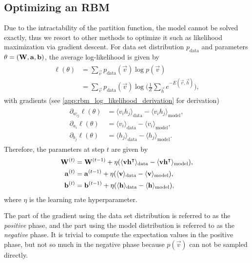\subsection{Optimizing an RBM}
Due to the intractability of the partition function, the model cannot be solved exactly, thus we resort to other methods to optimize it such as likelihood maximization via gradient descent.
For data set distribution \( p_\text{data} \) and parameters \( \theta = (\mathbf{W}, \mathbf{a}, \mathbf{b}) \), the average log-likelihood is given by
\begin{align}
\begin{split}
    \ell(\theta)
        &= \sum_{\vec{v}} p_{\text{data}}(\vec{v}) \log p(\vec{v}) \\
        &= \sum_{\vec{v}} p_{\text{data}}(\vec{v}) \log \bigg(\frac{1}{Z} \sum_\vec{h} e^{-E(\vec{v},\vec{h})}\bigg),
\end{split}
\end{align}
with gradients (see \cref{app:rbm_log_likelihood_derivation} for derivation)
\begin{align}
\begin{split}
    \partial_{w_{ij}} \ell(\theta)
        &= \langle v_i h_j \rangle_{\text{data}} - \langle v_i h_j \rangle_{\text{model}}, \\
    \partial_{a_i} \ell(\theta)
        &= \langle v_i \rangle_{\text{data}} - \langle v_i \rangle_{\text{model}}, \\
    \partial_{b_j} \ell(\theta)
        &= \langle h_j \rangle_{\text{data}} - \langle h_j \rangle_{\text{model}}.
\end{split}
\end{align}
Therefore, the parameters at step \( t \) are given by
\begin{align}
\begin{split}
    \mathbf{W}^{(t)}
        &= \mathbf{W}^{(t-1)} + \eta(\langle \mathbf{v} \mathbf{h}^\intercal \rangle_{\text{data}} - \langle \mathbf{v} \mathbf{h}^\intercal \rangle_{\text{model}}), \\
    \mathbf{a}^{(t)}
        &= \mathbf{a}^{(t-1)} + \eta(\langle \mathbf{v} \rangle_{\text{data}} - \langle \mathbf{v} \rangle_{\text{model}}), \\
    \mathbf{b}^{(t)}
        &= \mathbf{b}^{(t-1)} + \eta(\langle \mathbf{h} \rangle_{\text{data}} - \langle \mathbf{h} \rangle_{\text{model}}),
\end{split}
\end{align}
where \( \eta \) is the learning rate hyperparameter.

The part of the gradient using the data set distribution is referred to as the \textit{positive} phase, and the part using the model distribution is referred to as the \textit{negative} phase.
It is trivial to compute the expectation values in the positive phase, but not so much in the negative phase because \( p(\vec{v}) \) can not be sampled directly.

